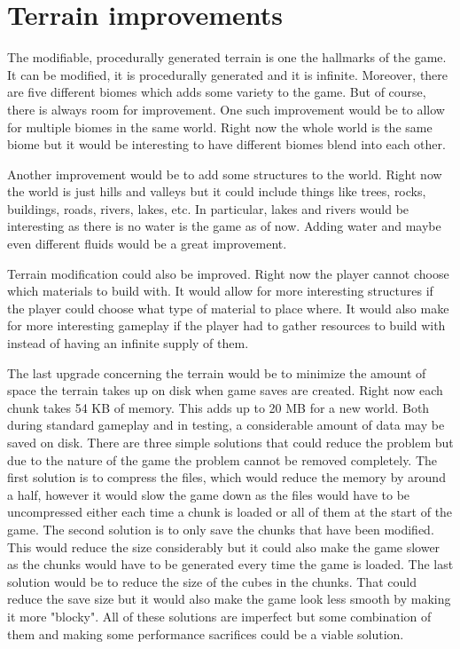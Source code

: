 \section{Terrain improvements}
The modifiable, procedurally generated terrain is one the hallmarks of the game.
It can be modified, it is procedurally generated and it is infinite.
Moreover, there are five different biomes which adds some variety to the game.
But of course, there is always room for improvement.
One such improvement would be to allow for multiple biomes in the same world.
Right now the whole world is the same biome but it would be interesting to have different biomes blend into each other.

Another improvement would be to add some structures to the world.
Right now the world is just hills and valleys but it could include things like trees, rocks, buildings, roads, rivers, lakes, etc.
In particular, lakes and rivers would be interesting as there is no water is the game as of now.
Adding water and maybe even different fluids would be a great improvement.

Terrain modification could also be improved.
Right now the player cannot choose which materials to build with.
It would allow for more interesting structures if the player could choose what type of material to place where.
It would also make for more interesting gameplay if the player had to gather resources to build with instead of having an infinite supply of them.

The last upgrade concerning the terrain would be to minimize the amount of space the terrain takes up on disk when game saves are created.
Right now each chunk takes 54 KB of memory.
This adds up to 20 MB for a new world.
Both during standard gameplay and in testing, a considerable amount of data may be saved on disk.
There are three simple solutions that could reduce the problem but due to the nature of the game the problem cannot be removed completely.
The first solution is to compress the files, which would reduce the memory by around a half, however it would slow the game down as the files would have to be uncompressed either each time a chunk is loaded or all of them at the start of the game.
The second solution is to only save the chunks that have been modified.
This would reduce the size considerably but it could also make the game slower as the chunks would have to be generated every time the game is loaded.
The last solution would be to reduce the size of the cubes in the chunks. 
That could reduce the save size but it would also make the game look less smooth by making it more "blocky".
All of these solutions are imperfect but some combination of them and making some performance sacrifices could be a viable solution.